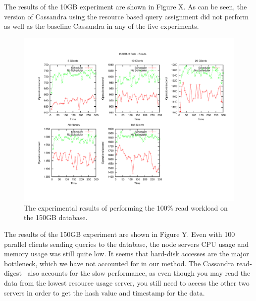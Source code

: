 \documentclass[]{acm_proc_article-sp}
\begin{document}
The results of the 10GB experiment are shown in Figure X. As can be seen, the version of Cassandra using the resource based query assignment did not perform as well as the baseline Cassandra in any of the five experiments.

\begin{figure}[t]
\centering
\includegraphics[scale=0.5]{images/150GB_Reads.pdf}
\vspace{-15pt}
\caption{The experimental results of performing the 100\% read workload on the 150GB database.}
\label{fig:150g_reads}
\end{figure}

The results of the 150GB experiment are shown in Figure Y. Even with 100 parallel clients sending queries to the database, the node servers CPU usage and memory usage was still quite low. It seems that hard-disk accesses are the major bottleneck, which we have not accounted for in our method. The Cassandra read-digest~\cite{http://wiki.apache.org/cassandra/DigestQueries} also accounts for the slow performance, as even though you may read the data from the lowest resource usage server, you still need to access the other two servers in order to get the hash value and timestamp for the data.
\end{document}
